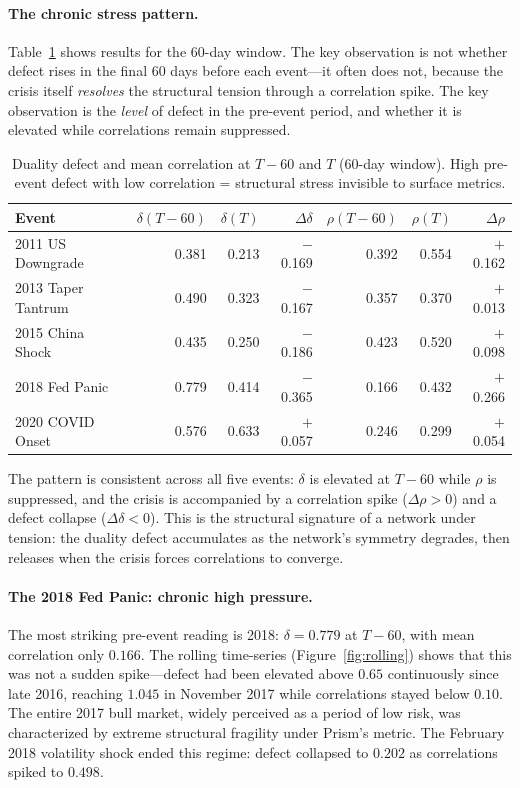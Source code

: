 \documentclass[11pt]{article}
\begin{document}
\paragraph{The chronic stress pattern.}
Table~\ref{tab:backtest} shows results for the 60-day window.
The key observation is not whether defect rises in the final 60 days
before each event---it often does not, because the crisis itself
\emph{resolves} the structural tension through a correlation spike.
The key observation is the \emph{level} of defect in the pre-event
period, and whether it is elevated while correlations remain suppressed.

\begin{table}[h]
\centering
\caption{Duality defect and mean correlation at $T{-}60$ and $T$
(60-day window). High pre-event defect with low correlation = structural
stress invisible to surface metrics.}
\label{tab:backtest}
\begin{tabular}{lrrrrrr}
\toprule
Event & $\delta(T{-}60)$ & $\delta(T)$ & $\Delta\delta$ &
        $\rho(T{-}60)$ & $\rho(T)$ & $\Delta\rho$ \\
\midrule
2011 US Downgrade   & 0.381 & 0.213 & $-$0.169 & 0.392 & 0.554 & $+$0.162 \\
2013 Taper Tantrum  & 0.490 & 0.323 & $-$0.167 & 0.357 & 0.370 & $+$0.013 \\
2015 China Shock    & 0.435 & 0.250 & $-$0.186 & 0.423 & 0.520 & $+$0.098 \\
2018 Fed Panic      & 0.779 & 0.414 & $-$0.365 & 0.166 & 0.432 & $+$0.266 \\
2020 COVID Onset    & 0.576 & 0.633 & $+$0.057 & 0.246 & 0.299 & $+$0.054 \\
\bottomrule
\end{tabular}
\end{table}

The pattern is consistent across all five events: $\delta$ is elevated
at $T{-}60$ while $\rho$ is suppressed, and the crisis is accompanied
by a correlation spike ($\Delta\rho > 0$) and a defect collapse
($\Delta\delta < 0$).
This is the structural signature of a network under tension: the duality
defect accumulates as the network's symmetry degrades, then releases
when the crisis forces correlations to converge.

\paragraph{The 2018 Fed Panic: chronic high pressure.}
The most striking pre-event reading is 2018: $\delta = 0.779$ at
$T{-}60$, with mean correlation only $0.166$.
The rolling time-series (Figure~\ref{fig:rolling}) shows that this was
not a sudden spike---defect had been elevated above $0.65$ continuously
since late 2016, reaching $1.045$ in November 2017 while correlations
stayed below $0.10$.
The entire 2017 bull market, widely perceived as a period of low risk,
was characterized by extreme structural fragility under Prism's metric.
The February 2018 volatility shock ended this regime: defect collapsed
to $0.202$ as correlations spiked to $0.498$.
\end{document}
